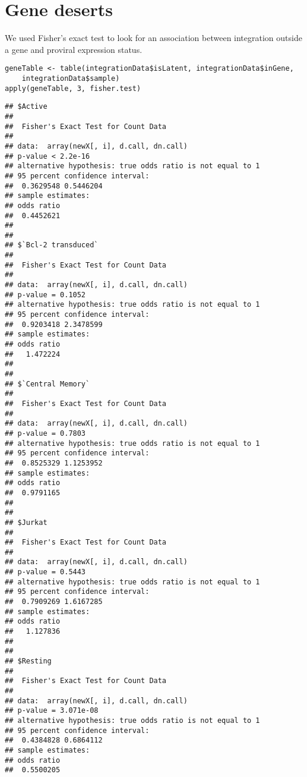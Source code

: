 \documentclass[../../sherrill-Mix_thesis.tex]{subfiles}
\makeatletter
\newenvironment{kframe}{%
 \def\at@end@of@kframe{}%
 \ifinner\ifhmode%
  \def\at@end@of@kframe{\end{minipage}}%
  \begin{minipage}{\columnwidth}%
 \fi\fi%
 \def\FrameCommand##1{\hskip\@totalleftmargin \hskip-\fboxsep
 \colorbox{shadecolor}{##1}\hskip-\fboxsep
     \hskip-\linewidth \hskip-\@totalleftmargin \hskip\columnwidth}%
 \MakeFramed {\advance\hsize-\width
   \@totalleftmargin\z@ \linewidth\hsize
   \@setminipage}}%
 {\par\unskip\endMakeFramed%
 \at@end@of@kframe}
\newenvironment{knitrout}{}{} %
\makeatother
\begin{document}
\section{Gene deserts}
We used Fisher's exact test to look for an association between integration outside a gene and proviral expression status.
\begin{knitrout}
\color{fgcolor}\begin{kframe}
\begin{lstlisting}[basicstyle=\ttfamily,breaklines=true]
geneTable <- table(integrationData$isLatent, integrationData$inGene, 
    integrationData$sample)
apply(geneTable, 3, fisher.test)\end{lstlisting}
\begin{lstlisting}[basicstyle=\ttfamily,breaklines=true]
## $Active
## 
## 	Fisher's Exact Test for Count Data
## 
## data:  array(newX[, i], d.call, dn.call)
## p-value < 2.2e-16
## alternative hypothesis: true odds ratio is not equal to 1
## 95 percent confidence interval:
##  0.3629548 0.5446204
## sample estimates:
## odds ratio 
##  0.4452621 
## 
## 
## $`Bcl-2 transduced`
## 
## 	Fisher's Exact Test for Count Data
## 
## data:  array(newX[, i], d.call, dn.call)
## p-value = 0.1052
## alternative hypothesis: true odds ratio is not equal to 1
## 95 percent confidence interval:
##  0.9203418 2.3478599
## sample estimates:
## odds ratio 
##   1.472224 
## 
## 
## $`Central Memory`
## 
## 	Fisher's Exact Test for Count Data
## 
## data:  array(newX[, i], d.call, dn.call)
## p-value = 0.7803
## alternative hypothesis: true odds ratio is not equal to 1
## 95 percent confidence interval:
##  0.8525329 1.1253952
## sample estimates:
## odds ratio 
##  0.9791165 
## 
## 
## $Jurkat
## 
## 	Fisher's Exact Test for Count Data
## 
## data:  array(newX[, i], d.call, dn.call)
## p-value = 0.5443
## alternative hypothesis: true odds ratio is not equal to 1
## 95 percent confidence interval:
##  0.7909269 1.6167285
## sample estimates:
## odds ratio 
##   1.127836 
## 
## 
## $Resting
## 
## 	Fisher's Exact Test for Count Data
## 
## data:  array(newX[, i], d.call, dn.call)
## p-value = 3.071e-08
## alternative hypothesis: true odds ratio is not equal to 1
## 95 percent confidence interval:
##  0.4384828 0.6864112
## sample estimates:
## odds ratio 
##  0.5500205
\end{lstlisting}
\end{kframe}
\end{knitrout}
\end{document}
